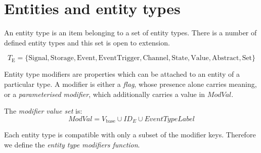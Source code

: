 \section{Entities and entity types}\label{sec:entities}

An entity type is an item belonging to a set of entity types. There is a number of defined entity types and this set is open to extension.

\begin{definition}\label{def:entity_type_set}
    \[
        T_\text{E} = \{ \text{Signal}, \text{Storage}, \text{Event}, \text{EventTrigger}, \text{Channel}, \text{State}, \text{Value}, \text{Abstract}, \text{Set}\}
    \]
\end{definition}

Entity type modifiers are properties which can be attached to an entity of a particular type.
A modifier is either a \emph{flag}, whose presence alone carries meaning, or a \emph{parameterised modifier}, which additionally carries a value in $\mathit{ModVal}$.

\begin{definition}\label{def:mod_val}
    The \emph{modifier value set} is:
    \[
        \mathit{ModVal} = V_{\text{base}} \cup \mathit{ID}_E \cup \mathit{EventTypeLabel}
    \]
\end{definition}

Each entity type is compatible with only a subset of the modifier keys.
Therefore we define the \textit{entity type modifiers function}.

